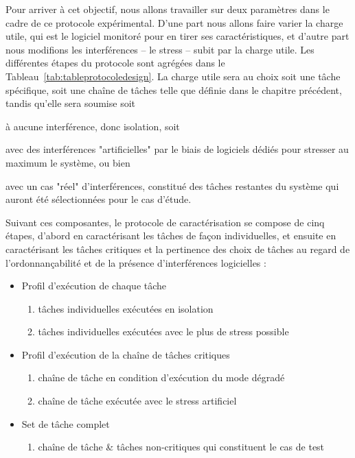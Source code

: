 \documentclass[french, a4paper, 11pt, twoside, pdftex]{StyleThese}
\begin{document}
        Pour arriver à cet objectif, nous allons travailler sur deux paramètres dans le cadre de ce protocole expérimental. D'une part nous allons faire varier la charge utile, qui est le logiciel monitoré pour en tirer ses caractéristiques, et d'autre part nous modifions les interférences -- le stress -- subit par la charge utile. Les différentes étapes du protocole sont agrégées dans le Tableau~\ref{tab:tableprotocoledesign}. La charge utile sera au choix soit une tâche spécifique, soit une chaîne de tâches telle que définie dans le chapitre précédent, tandis qu'elle sera soumise soit \begin{enumerate*}[label=\bfseries\alph*)] \item à aucune interférence, donc isolation, soit \item avec des interférences "artificielles" par le biais de logiciels dédiés pour stresser au maximum le système, ou bien \item avec un cas "réel" d'interférences, constitué des tâches restantes du système qui auront été sélectionnées pour le cas d'étude.\end{enumerate*}
        Suivant ces composantes, le protocole de caractérisation se compose de cinq étapes, d'abord en caractérisant les tâches de façon individuelles, et ensuite en caractérisant les tâches critiques et la pertinence des choix de tâches au regard de l'ordonnançabilité et de la présence d'interférences logicielles : 
        \begin{itemize}
        	\item Profil d'exécution de chaque tâche
	        \begin{enumerate}[label=\large\ctxt{\arabic*}]
	        	\item tâches individuelles exécutées en isolation
	        	\item tâches individuelles exécutées avec le plus de stress possible
	        \end{enumerate}
        	\item Profil d'exécution de la chaîne de tâches critiques
        	\begin{enumerate}[resume*]
        		\item chaîne de tâche en condition d'exécution du mode dégradé 
        		\item chaîne de tâche exécutée avec le stress artificiel
        	\end{enumerate}
        	\item Set de tâche complet
        	\begin{enumerate}[resume*]
        		\item chaîne de tâche \& tâches non-critiques qui constituent le cas de test 
        	\end{enumerate}
        \end{itemize}
    
\end{document}
